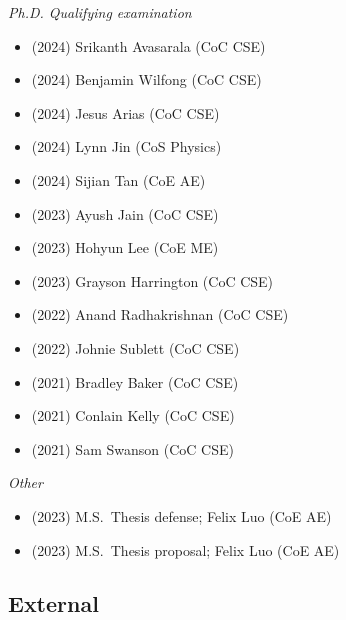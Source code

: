 \textit{Ph.D. Qualifying examination}
\vspace{-0.25cm}
\begin{multicols}{2}
\begin{itemize}
    \item (2024)  Srikanth Avasarala (CoC CSE)
    \item (2024)  Benjamin Wilfong (CoC CSE)
    \item (2024)  Jesus Arias (CoC CSE)
    \item (2024)  Lynn Jin (CoS Physics)
    \item (2024)  Sijian Tan (CoE AE)
    \item (2023)  Ayush Jain (CoC CSE)
    \item (2023)  Hohyun Lee (CoE ME)
    \item (2023)  Grayson Harrington (CoC CSE)
    \item (2022)  Anand Radhakrishnan (CoC CSE)
    \item (2022)  Johnie Sublett (CoC CSE)
    \item (2021)  Bradley Baker (CoC CSE)
    \item (2021)  Conlain Kelly (CoC CSE)
    \item (2021)  Sam Swanson (CoC CSE)
\end{itemize}
\end{multicols}

\textit{Other}
\vspace{-0.1cm}
\begin{itemize}
    \item (2023) M.S.\  Thesis defense;  Felix Luo (CoE AE)
    \item (2023) M.S.\  Thesis proposal; Felix Luo (CoE AE)
\end{itemize}

\subsection{External}

